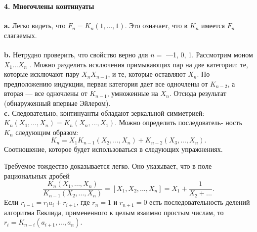 \documentclass{mai_book}
\begin{document}
\noindent\textbf{4. Многочлены континуаты}\\
\\
\hspace*{15pt}\textbf{a.} Легко видеть, что $F_n=K_n(1,...,1)$. Это означает, что в $K_n$\linebreak
имеется $F_n$ слагаемых.\\
\\
\hspace*{15pt}\textbf{b.} Нетрудно проверить, что свойство верно для $n=$ —1, 0, 1.\linebreak
Рассмотрим моном $X_1...X_n$ . Можно разделить исключения примыкающих\linebreak
пар на две категории: те, которые исключают пару $X_nX_{n-1}$, и те,\linebreak
которые оставляют $X_n$. По предположению индукции, первая категория\linebreak
дает все одночлены от $K_{n-2}$, а вторая — все одночлены от $K_{n-1}$,\linebreak
умноженные на $X_n$. Отсюда результат (обнаруженный впервые Эйлером).\linebreak
\\
\hspace*{15pt}\textbf{c.} Следовательно, континуанты обладают зеркальной симметрией:\linebreak
$K_n(X_1,...,X_n)=K_n(X_n,...,X_1)$. Можно определить последователь­-\linebreak
ность $K_n$ следующим образом:
$$K_n=X_1K_{n-1}(X_2,...,X_n)+K_{n-2}(X_3,...,X_n).$$
Соотношение, которое будет использоваться в следующих упражне­ниях.\newpage

Требуемое тождество доказывается легко. Оно указывает, что в\linebreak
по­ле рациональных дробей
$$ \frac{K_n(X_1,...,X_n)}{K_{n-1}(X_2,...,X_n)}=[X_1,X_2,...,X_n]=X_1+\frac{1}{X_2+...}.$$
Если $r_{i-1}=r_ia_i+r_{i+1}$, где $r_n=1$ и $r_{n+1}=0$ есть последовательность\linebreak
делений алгоритма Евклида, примененного к целым взаимно простым\linebreak
числам, то $r_i=K_{n-i}(a_{i+1},...,a_n)$.\newline
\\
\end{document}
